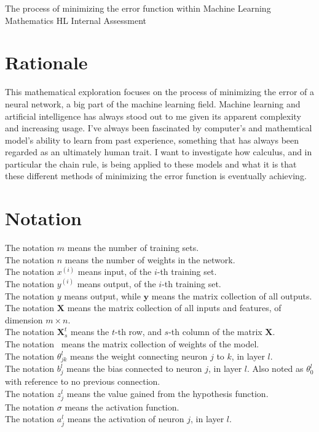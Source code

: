 \documentclass[a4paper,12pt]{article}
\begin{document}
\begin{center}
\Huge The process of minimizing the error function within Machine Learning \\
\small Mathematics HL Internal Assessment
\end{center}

\section{Rationale}
This mathematical exploration focuses on the process of minimizing the error of a neural network, a big part of the machine learning field. Machine learning and artificial intelligence has always stood out to me given its apparent complexity and increasing usage. I've always been fascinated by computer's and mathemtical model's ability to learn from past experience, something that has always been regarded as an ultimately human trait. I want to investigate how calculus, and in particular the chain rule, is being applied to these models and what it is that these different methods of minimizing the error function is eventually achieving. 

\section{Notation}
The notation \(m\) means the number of training sets. \\
The notation \(n\) means the number of weights in the network.  \\
The notation $x^{(i)}$ means input, of the $i$-th training set.  \\
The notation $y^{(i)}$ means output, of the $i$-th training set.  \\
The notation $y$ means output, while $\boldsymbol{y}$ means the matrix collection of all outputs. \\
The notation $\boldsymbol{X}$ means the matrix collection of all inputs and features, of dimension $m \times n$.\\
The notation $\boldsymbol{X}^t_s$ means the $t$-th row, and $s$-th column of the matrix $\boldsymbol{X}$. \\
The notation \boldmath{$\Theta$}\unboldmath \ means the matrix collection of weights of the model. \\
The notation $\theta_{jk}^l$ means the weight connecting neuron $j$ to $k$, in layer $l$. \\
The notation $b_j^l$ means the bias connected to neuron $j$, in layer $l$. Also noted as $\theta^l_0$ with reference to no previous connection.\\
The notation $z_j^l$ means the value gained from the hypothesis function. \\
The notation $\sigma$ means the activation function. \\
The notation $a^l_j$ means the activation of neuron $j$, in layer $l$. 
\end{document}
